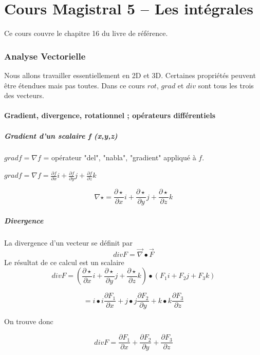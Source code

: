 \part{Cours Magistral 5 -- Les intégrales}
Ce cours couvre le chapitre 16 du livre de référence.

\section{Analyse Vectorielle}


Nous allons travailler essentiellement en 2D et 3D. Certaines propriétés peuvent être étendues mais pas toutes. Dans ce cours $rot$, $grad$ et $div$ sont tous les trois des vecteurs.

\subsection{Gradient, divergence, rotationnel ; opérateurs différentiels}
\subsubsection{Gradient d'un scalaire f (x,y,z)}

$grad f = \nabla f$ = opérateur "del", "nabla", "gradient" appliqué à $f$.

$grad f = \nabla f =\frac{\partial f}{\partial x} i +\frac{\partial f}{\partial y} j +\frac{\partial f}{\partial z} k$

\[\nabla \star = \frac{\partial \star}{\partial x} i +\frac{\partial \star}{\partial y} j +\frac{\partial \star}{\partial z} k\]
\subsubsection{Divergence}
\begin{mydef}
La divergence d'un vecteur se définit par
\[div F = \vec \nabla \bullet \vec F\]
Le résultat de ce calcul est un scalaire
\[div F = \left( \frac{\partial \star}{\partial x} i +\frac{\partial \star}{\partial y} j +\frac{\partial \star}{\partial z} k \right) \bullet (F_1 i +F_2 j +F_3 k) \]

\[= i\bullet i \frac{\partial F_1}{\partial x}+j\bullet j \frac{\partial F_2}{\partial y}+k\bullet k \frac{\partial F_3}{\partial z}  \]

On trouve donc

\[div F = \frac{\partial F_1}{\partial x}+\frac{\partial F_2}{\partial y}+\frac{\partial F_3}{\partial z}\]
\end{mydef}

